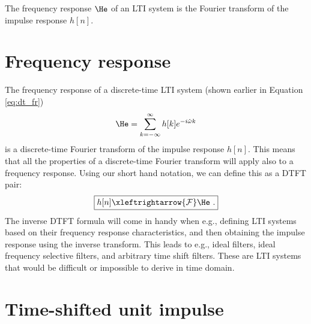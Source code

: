 \fi




\usetikzlibrary{arrows.meta, positioning, quotes}
\begin{marginfigure}
 \begin{center}
\end{center}
\caption{The frequency response $\He$ of an LTI system is the Fourier transform of the impulse response $h[n]$.}
\end{marginfigure}

\section{Frequency response}

The frequency response of a discrete-time LTI system (shown earlier in Equation \ref{eq:dt_fr}) 
\begin{equation}
\He = \sum_{k=-\infty}^{\infty} h[k] e^{-i\hat{\omega} k}
\end{equation}
is a discrete-time Fourier transform of the impulse response
$h[n]$. This means that all the properties of a discrete-time Fourier
transform will apply also to a frequency response. Using our short
hand notation, we can define this as a DTFT pair:
\begin{equation}
\boxed{
h[n] \xleftrightarrow{\mathcal{F}} \He\,\,.
}
\end{equation}
The inverse DTFT formula will come in handy when e.g., defining LTI
systems based on their frequency response characteristics, and then
obtaining the impulse response using the inverse transform. This leads
to e.g., ideal filters, ideal frequency selective filters, and
arbitrary time shift filters. These are LTI systems that would be
difficult or impossible to derive in time domain.

\section{Time-shifted unit impulse}

